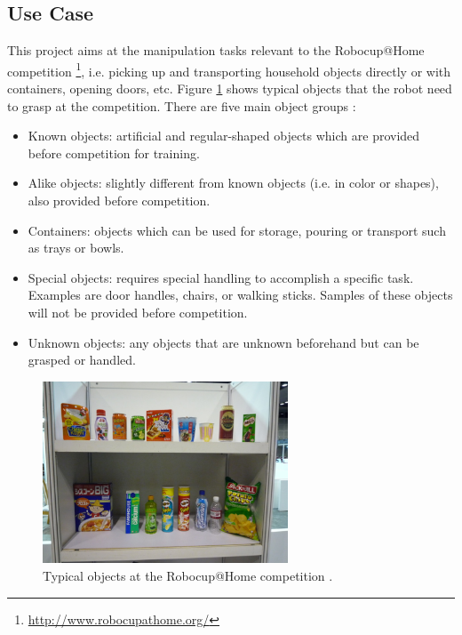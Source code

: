 \documentclass[12pt]{article}
\begin{document}
    \subsection{Use Case} \label{use-case}
    This project aims at the manipulation tasks relevant to the Robocup@Home competition \footnote{\url{http://www.robocupathome.org/}}, i.e. picking up and transporting household objects directly or with containers, opening doors, etc. Figure \ref{fig:robocup_objects} shows typical objects that the robot need to grasp at the competition. There are five main object groups \cite{vanBeek17}:
    \begin{itemize}
    	\item Known objects: artificial and regular-shaped objects which are provided before competition for training.
    	\item Alike objects: slightly different from known objects (i.e. in color or shapes), also provided before competition.
    	\item Containers: objects which can be used for storage, pouring or transport such as trays or bowls.
    	\item Special objects: requires special handling to accomplish a specific task. Examples are door handles, chairs, or walking sticks. Samples of these objects will not be provided before competition.
    	\item Unknown objects: any objects that are unknown beforehand but can be grasped or handled.
    \end{itemize}
    \begin{figure}[H]
    	\centering
    	\includegraphics[width=0.65\textwidth]{vanBeek17-robocup_objects}
    	\caption{Typical objects at the Robocup@Home competition \cite{vanBeek17}.}
    	\label{fig:robocup_objects}
    \end{figure}

\end{document}
